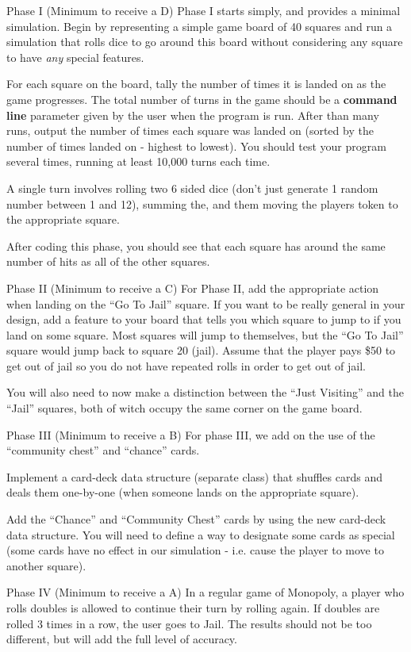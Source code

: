 \documentclass[11pt]{exam}
\begin{document}
\begin{questions}
\question[70] Phase I (Minimum to receive a D)
Phase I starts simply, and provides a minimal simulation.  Begin by representing a simple game board of 40 squares and run a simulation that rolls dice to go around this board without considering any square to have {\it any} special features.
\par
For each square on the board, tally the number of times it is landed on as the game progresses.   The total number of turns in the game should be a {\bf command line} parameter given by the user when the program is run.  After than many runs, output the number of times each square was landed on (sorted by the number of times landed on - highest to lowest).   You should test your program several times, running at least 10,000 turns each time.
\par
A single turn involves rolling two 6 sided dice (don't just generate 1 random number between 1 and 12), summing the, and them moving the players token to the appropriate square.
\par
After coding this phase, you should see that each square has around the same number of hits as all of the other squares.

\question[10] Phase II (Minimum to receive a C)
For Phase II, add the appropriate action when landing on the ``Go To Jail'' square.  If you want to be really general in your design, add a feature to your board that tells you which square to jump to if you land on some square.  Most squares will jump to themselves, but the ``Go To Jail'' square would jump back to square 20 (jail).   Assume that the player pays \$50 to get out of jail so you do not have repeated rolls in order to get out of jail.
\par
You will also need to now make a distinction between the ``Just Visiting'' and the ``Jail'' squares, both of witch occupy the same corner on the game board.

\question[10] Phase III (Minimum to receive a B)
For phase III, we add on the use of the ``community chest'' and ``chance'' cards.
\par
Implement a card-deck data structure (separate class) that shuffles cards and deals them one-by-one (when someone lands on the appropriate square).
\par
Add the ``Chance'' and ``Community Chest'' cards by using the new card-deck data structure.   You will need to define a way to designate some cards as special (some cards have no effect in our simulation - i.e. cause the player to move to another square).

\question[10] Phase IV (Minimum to receive a A)
In a regular game of Monopoly, a player who rolls doubles is allowed to continue their turn by rolling again.   If doubles are rolled 3 times in a row, the user goes to Jail.   The results should not be too different, but will add the full level of accuracy.

\end{questions}
\end{document}
